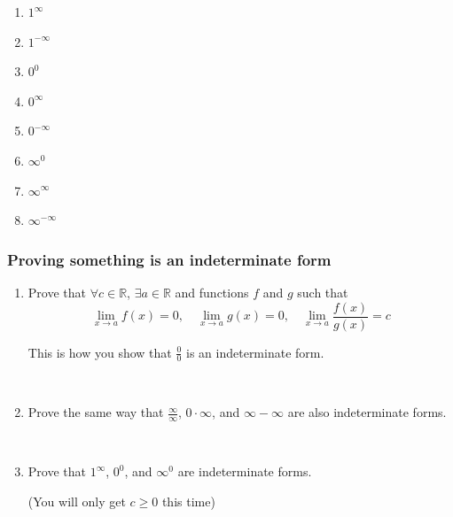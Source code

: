 \begin{frame}[t]
\begin{multicols}{4}
\begin{enumerate}
			\item $\displaystyle 1^{\infty}$

			\item $\displaystyle 1^{-\infty}$

			\item $\displaystyle 0^{0}$

			\item $\displaystyle 0^{\infty}$

			\item $\displaystyle 0^{-\infty}$

			\item $\displaystyle \infty^{0}$

			\item $\displaystyle \infty^{\infty}$

			\item $\displaystyle \infty^{-\infty}$
		\end{enumerate}
	\end{multicols}
\end{frame}

\begin{frame}[t]
	\fontsize{13}{13}\selectfont
	\frametitle{Proving something is an indeterminate form}

	\begin{enumerate}
		\item Prove that $\displaystyle \forall c \in \mathbb{R}$,
			$\displaystyle \exists a \in \mathbb{R}$ and functions $f$ and $g$ such
			that
			\[
				\lim_{x \to a}f(x) = 0, \quad \lim_{x \to a}g(x) =0, \quad \lim_{x \to a}
				\frac{f(x)}{g(x)}= c
			\]

			This is how you show that $\displaystyle \frac{0}{0}$ is an indeterminate form.

			\

		\item Prove the same way that $\displaystyle \frac{\infty}{\infty}$,
			$\displaystyle 0 \cdot \infty$, and $\displaystyle \infty - \infty$ are also
			indeterminate forms.

			\

		\item Prove that $\displaystyle 1^{\infty}$, $\displaystyle 0^{0}$, and $\displaystyle
			\infty^{0}$ are indeterminate forms.

			(You will only get $c \geq 0$ this time)
	\end{enumerate}
\end{frame}

